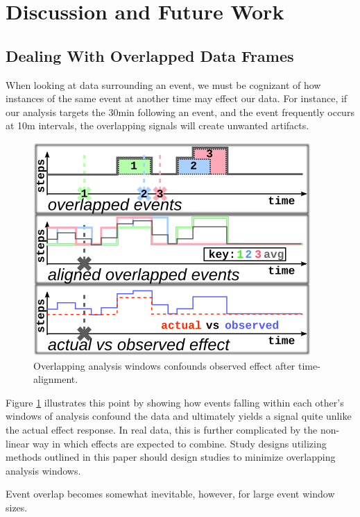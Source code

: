 \section{Discussion and Future Work}

\subsection{Dealing With Overlapped Data Frames}
When looking at data surrounding an event, we must be cognizant of how instances of the same event at another time may effect our data.
For instance, if our analysis targets the 30min following an event, and the event frequently occurs at 10m intervals, the overlapping signals will create unwanted artifacts.

\begin{figure}
\centering
\includegraphics[width=0.9\columnwidth]{./img/eventOverlapExample.png}
\caption{Overlapping analysis windows confounds observed effect after time-alignment.}
\label{fig:overlapExample}
\end{figure}

Figure \ref{fig:overlapExample} illustrates this point by showing how events falling within each other's windows of analysis confound the data and ultimately yields a signal quite unlike the actual effect response.
In real data, this is further complicated by the non-linear way in which effects are expected to combine.
Study designs utilizing methods outlined in this paper should design studies to minimize overlapping analysis windows.

Event overlap becomes somewhat inevitable, however, for large event window sizes.

